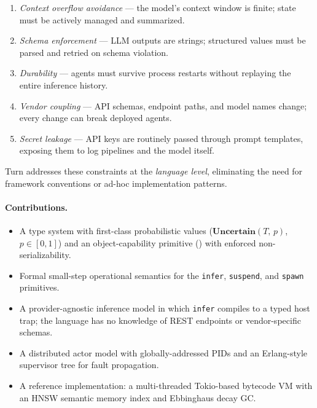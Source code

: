 \documentclass[sigplan,10pt,review,anonymous]{acmart}
\newcommand{\uncertain}[2]{\mathbf{Uncertain}(#1,\, #2)}
\newcommand{\captype}{\mathbf{Cap}}
\begin{document}
\begin{enumerate}
  \item \emph{Context overflow avoidance} — the model's context window is
        finite; state must be actively managed and summarized.
  \item \emph{Schema enforcement} — LLM outputs are strings; structured
        values must be parsed and retried on schema violation.
  \item \emph{Durability} — agents must survive process restarts without
        replaying the entire inference history.
  \item \emph{Vendor coupling} — API schemas, endpoint paths, and model
        names change; every change can break deployed agents.
  \item \emph{Secret leakage} — API keys are routinely passed through
        prompt templates, exposing them to log pipelines and the model itself.
\end{enumerate}

Turn addresses these constraints at the \emph{language level}, eliminating
the need for framework conventions or ad-hoc implementation patterns.

\paragraph{Contributions.}
\begin{itemize}
  \item A type system with first-class probabilistic values
        ($\uncertain{T}{p}$, $p \in [0,1]$) and an object-capability
        primitive (\captype{}) with enforced non-serializability.
  \item Formal small-step operational semantics for the \texttt{infer},
        \texttt{suspend}, and \texttt{spawn} primitives.
  \item A provider-agnostic inference model in which \texttt{infer}
        compiles to a typed host trap; the language has no knowledge of
        REST endpoints or vendor-specific schemas.
  \item A distributed actor model with globally-addressed PIDs and an
        Erlang-style supervisor tree for fault propagation.
  \item A reference implementation: a multi-threaded Tokio-based bytecode
        VM with an HNSW semantic memory index and Ebbinghaus decay GC.
\end{itemize}

\end{document}
